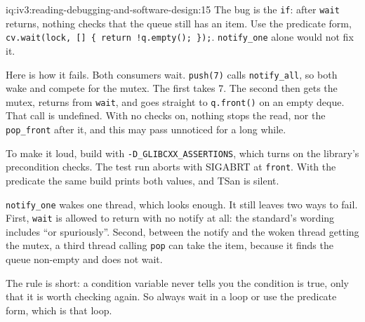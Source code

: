 \begin{solution}{iq:iv3:reading-debugging-and-software-design:15}
The bug is the \texttt{if}: after \texttt{wait} returns, nothing checks that the queue still has an item. Use the predicate form, \texttt{cv.wait(lock, [] \{ return !q.empty(); \});}. \texttt{notify\_one} alone would not fix it.

Here is how it fails. Both consumers wait. \texttt{push(7)} calls \texttt{notify\_all}, so both wake and compete for the mutex. The first takes 7. The second then gets the mutex, returns from \texttt{wait}, and goes straight to \texttt{q.front()} on an empty deque. That call is undefined. With no checks on, nothing stops the read, nor the \texttt{pop\_front} after it, and this may pass unnoticed for a long while.

To make it loud, build with \texttt{-D\_GLIBCXX\_ASSERTIONS}, which turns on the library's precondition checks. The test run aborts with SIGABRT at \texttt{front}. With the predicate the same build prints both values, and TSan is silent.

\texttt{notify\_one} wakes one thread, which looks enough. It still leaves two ways to fail. First, \texttt{wait} is allowed to return with no notify at all: the standard's wording includes ``or spuriously''. Second, between the notify and the woken thread getting the mutex, a third thread calling \texttt{pop} can take the item, because it finds the queue non-empty and does not wait.

The rule is short: a condition variable never tells you the condition is true, only that it is worth checking again. So always wait in a loop or use the predicate form, which is that loop.


\end{solution}

